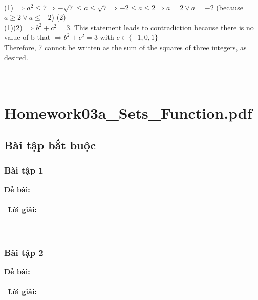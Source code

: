 \documentclass[a4paper]{article}
\begin{document}
\\(1) $\Rightarrow a^{2} \leqslant 7 \Rightarrow -\sqrt{7} \leqslant a \leqslant \sqrt{7} \Rightarrow -2 \leqslant a \leqslant 2 \Rightarrow a=2 \lor a=-2$ (because $a \geqslant 2 \lor a \leqslant -2$) (2)
\\(1)(2) $\Rightarrow b^{2}+c^{2}=3$.
This statement leads to contradiction because there is no value of b that $\Rightarrow b^{2}+c^{2}=3$ with $c \in \{-1,0,1\}$
\\Therefore, 7 cannot be written as the sum of the squares of three integers, as desired. \\\ \\\
\clearpage

\section{Homework03a\_Sets\_Function.pdf}
\subsection{Bài tập bắt buộc}
\subsubsection{Bài tập 1}
\textbf{Đề bài:} 
\\\ \\\
\textbf{Lời giải:} \\\ \\\
\clearpage
\subsubsection{Bài tập 2}
\textbf{Đề bài:} 
\\\ \\\
\textbf{Lời giải:} \\\ \\\
\clearpage
\end{document}

